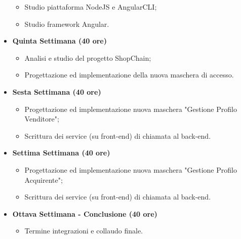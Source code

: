 \begin{itemize}
\begin{itemize}
            \item Studio piattaforma NodeJS e AngularCLI;
            \item Studio framework Angular.
        \end{itemize}
        \item \textbf{Quinta Settimana (40 ore)} 
        \begin{itemize}
            \item Analisi e studio del progetto ShopChain;
            \item Progettazione ed implementazione della nuova maschera di accesso.
        \end{itemize}
        \item \textbf{Sesta Settimana (40 ore)} 
        \begin{itemize}
            \item Progettazione ed implementazione nuova maschera "Gestione Profilo Venditore";
            \item Scrittura dei service (su front-end) di chiamata al back-end.
        \end{itemize}
        \item \textbf{Settima Settimana (40 ore)} 
        \begin{itemize}
            \item Progettazione ed implementazione nuova maschera "Gestione Profilo Acquirente";
            \item Scrittura dei service (su front-end) di chiamata al back-end.
        \end{itemize}
        \item \textbf{Ottava Settimana - Conclusione (40 ore)} 
        \begin{itemize}
            \item Termine integrazioni e collaudo finale.
        \end{itemize}
\end{itemize}